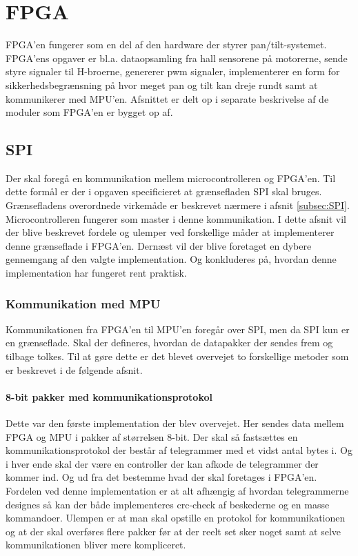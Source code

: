 \section{FPGA}
FPGA'en fungerer som en del af den hardware der styrer pan/tilt-systemet. FPGA'ens opgaver er bl.a. dataopsamling fra hall sensorene på motorerne, sende styre signaler til H-broerne, genererer pwm signaler, implementerer en form for sikkerhedsbegrænsning på hvor meget pan og tilt kan dreje rundt samt at kommunikerer med MPU'en. Afsnittet er delt op i separate beskrivelse af de moduler som FPGA'en er bygget op af. \\

\subsection{SPI}
Der skal foregå en kommunikation mellem microcontrolleren og FPGA'en. Til dette formål er der i opgaven specificieret at grænsefladen SPI skal bruges. Grænsefladens overordnede virkemåde er beskrevet nærmere i afsnit \ref{subsec:SPI}. Microcontrolleren fungerer som master i denne kommunikation. I dette afsnit vil der blive beskrevet fordele og ulemper ved forskellige måder at implementerer denne grænseflade i FPGA'en. Dernæst vil der blive foretaget en dybere gennemgang af den valgte implementation. Og konkluderes på, hvordan denne implementation har fungeret rent praktisk.

\subsubsection{Kommunikation med MPU}
Kommunikationen fra FPGA'en til MPU'en foregår over SPI, men da SPI kun er en grænseflade. Skal der defineres, hvordan de datapakker der sendes frem og tilbage tolkes. Til at gøre dette er det blevet overvejet to forskellige metoder som er beskrevet i de følgende afsnit.

\paragraph*{8-bit pakker med kommunikationsprotokol}
Dette var den første implementation der blev overvejet. Her sendes data mellem FPGA og MPU i pakker af størrelsen 8-bit. Der skal så fastsættes en kommunikationsprotokol der består af telegrammer med et vidst antal bytes i. Og i hver ende skal der være en controller der kan afkode de telegrammer der kommer ind. Og ud fra det bestemme hvad der skal foretages i FPGA'en. Fordelen ved denne implementation er at alt afhængig af hvordan telegrammerne designes så kan der både implementeres crc-check af beskederne og en masse kommandoer. Ulempen er at man skal opstille en protokol for kommunikationen og at der skal overføres flere pakker før at der reelt set sker noget samt at selve kommunikationen bliver mere kompliceret.

